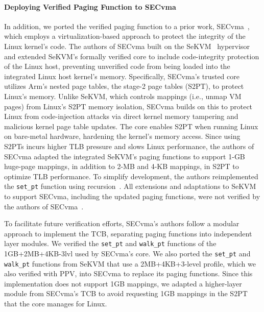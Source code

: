 \paragraph{Deploying Verified Paging Function to SECvma}
In addition, we ported the verified paging function to a prior work, SECvma~\cite{secvma2024acsac}, which employs a virtualization-based approach to protect the integrity of the Linux kernel's code. The authors of SECvma built on the SeKVM~\cite{li:ieeesp2021} hypervisor and extended SeKVM's formally verified core to include code-integrity protection of the Linux host, preventing unverified code from being loaded into the integrated Linux host kernel's memory. Specifically, SECvma's trusted core utilizes Arm's nested page tables, the stage-2 page tables (S2PT), to protect Linux's memory. Unlike SeKVM, which controls mappings (i.e., unmap VM pages) from Linux's S2PT memory isolation, SECvma builds on this to protect Linux from code-injection attacks via direct kernel memory tampering and malicious kernel page table updates. The core enables S2PT when running Linux on bare-metal hardware, hardening the kernel's memory access.
Since using S2PTs incurs higher TLB pressure and slows Linux performance, the authors of SECvma adapted the integrated SeKVM's paging functions to support 1-GB huge-page mappings, in addition to 2-MB and 4-KB mappings, in S2PT to optimize TLB performance. To simplify development, the authors reimplemented the \texttt{set\_pt} function using recursion~\cite{secvma-artifact}. All extensions and adaptations to SeKVM to support SECvma, including the updated paging functions, were not verified by the authors of SECvma~\cite{secvma2024acsac}. 

To facilitate future verification efforts, SECvma's authors follow a modular approach to implement the TCB, separating paging functions into independent layer modules. We verified the \texttt{set\_pt} and \texttt{walk\_pt} functions of the 1GB+2MB+4KB-3lvl used by SECvma's core. We also ported the \texttt{set\_pt} and \texttt{walk\_pt} functions from SeKVM that use a 2MB+4KB+3-level profile, which we also verified with PPV, into SECvma to replace its paging functions. Since this implementation does not support 1GB mappings, we adapted a higher-layer module from SECvma's TCB to avoid requesting 1GB mappings in the S2PT that the core manages for Linux. 

